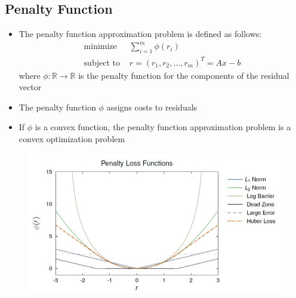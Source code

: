 \subsection*{Penalty Function}
\begin{itemize}
    \item
        The penalty function approximation problem is defined as follows:
        \begin{align*}
            \text{minimize } & \sum_{i=1}^m \phi(r_i)\\
            \text{subject to } & r=(r_1,r_2,\dots,r_m)^T = Ax-b
        \end{align*}
        where $\phi: \mathbb{R} \rightarrow \mathbb{R}$ is the penalty function for the components of the residual vector
    \item
        The penalty function $\phi$ assigns costs to residuals
    \item
        If $\phi$ is a convex function, the penalty function approximation problem is a convex optimization problem
\end{itemize}
\begin{figure}[H]
    \centering
    \includegraphics[scale=0.7]{figures/penalties}
\end{figure}

